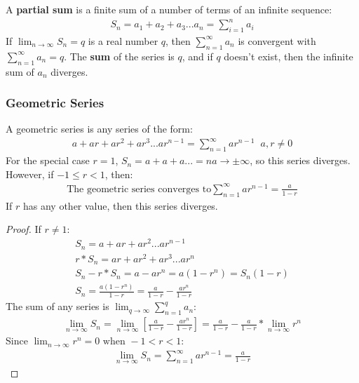 \documentclass{article}
\begin{document}
A \textbf{partial sum} is a finite sum of a number of terms of an infinite sequence:
\begin{gather*}
    S_n = a_1 + a_2 + a_3 ... a_n = \sum_{i=1}^n a_i
\end{gather*}
If $\lim_{n \to \infty} S_n = q$ is a real number $q$, then $\sum_{n=1}^\infty a_n$ is convergent with $\sum_{n=1}^\infty a_n = q$. The \textbf{sum} of the series is $q$, and if $q$ doesn't exist, then the infinite sum of $a_n$ diverges.
\subsubsection{Geometric Series}
A geometric series is any series of the form:
\begin{gather*}
    a + ar + ar^2 + ar^3 ... ar^{n-1} = \sum_{n=1}^\infty ar^{n-1}\hspace{7pt}a,r \neq 0
\end{gather*}
For the special case $r = 1$, $S_n = a + a + a... = na \to \pm \infty$, so this series diverges. However, if $-1 \leqslant r < 1$, then:
\begin{gather*}
    \textrm{The geometric series converges to} \sum_{n=1}^\infty ar^{n-1} = \frac{a}{1-r}
\end{gather*}
If $r$ has any other value, then this series diverges.
\begin{proof}
If $r \neq 1$:
\begin{gather*}
    S_n = a + ar + ar^2...ar^{n-1}\\
    r * S_n = ar + ar^2 + ar^3...ar^n\\
    S_n - r*S_n = a - ar^n = a(1 - r^n) = S_n(1-r)\\
    S_n = \frac{a(1-r^n)}{1-r} = \frac{a}{1-r} - \frac{ar^n}{1-r}
\end{gather*}
The sum of any series is $\lim_{q \to \infty} \sum_{n=1}^q a_n$:
\begin{gather*}
    \lim_{n \to \infty} S_n = \lim_{n \to \infty} [\frac{a}{1-r} - \frac{ar^n}{1-r}] = \frac{a}{1-r} - \frac{a}{1-r} * \lim_{n \to \infty} r^n
\end{gather*}
Since $\lim_{n \to \infty} r^n = 0 \textrm{ when } -1 < r < 1$:
\begin{gather*}
    \lim_{n \to \infty} S_n = \sum_{n=1}^\infty ar^{n-1} = \frac{a}{1-r}
\end{gather*}
\end{proof}
\end{document}
